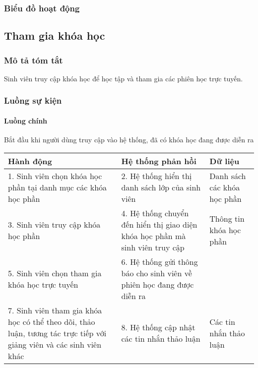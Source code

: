 \documentclass[./../main_file.tex]{subfiles}
\begin{document}
\subsubsection{Biểu đồ hoạt động}

\subsection{Tham gia khóa học}
\subsubsection{Mô tả tóm tắt}
Sinh viên truy cập khóa học để học tập và tham gia các phiên học trực tuyến.

\subsubsection{Luồng sự kiện}
\paragraph{Luồng chính}
Bắt đầu khi người dùng truy cập vào hệ thống, đã có khóa học đang được diễn ra
\begin{table}[H]
				\begin{tabular}{|p{.33\textwidth}|p{}|p{}|}
		\hline
		\textbf{Hành động}                                           & \textbf{Hệ thống phản hồi}                                                   & \textbf{Dữ liệu}           \\ \hline
		1. Sinh viên chọn khóa học phần tại danh mục các khóa học phần & 2. Hệ thống hiển thị danh sách lớp của sinh viên                             & Danh sách các khóa học phần \\ \hline
		3. Sinh viên truy cập khóa học phần                           & 4. Hệ thống chuyển đến hiển thị giao diện khóa học phần mà sinh viên truy cập & Thông tin khóa học phần     \\ \hline
		5. Sinh viên chọn tham gia khóa học trực tuyến                & 6. Hệ thống gửi thông báo cho sinh viên về phiên học đang được diễn ra       &                            \\ \hline
		7. Sinh viên tham gia khóa học có thể theo dõi, thảo luận, tương tác trực tiếp với giảng viên và các sinh viên khác &
		8. Hệ thống cập nhật các tin nhắn thảo luận &
		Các tin nhắn thảo luận \\ \hline
	\end{tabular}
\end{table}
\end{document}

